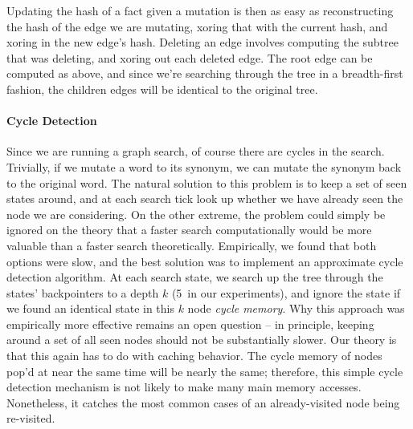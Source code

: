 Updating the hash of a fact given a mutation is then as easy as reconstructing the hash of the edge we are
  mutating, xoring that with the current hash, and xoring in the new edge's hash.
Deleting an edge involves computing the subtree that was deleting, and xoring out each deleted edge.
  The root edge can be computed as above, and since we're searching through the tree in a breadth-first
  fashion, the children edges will be identical to the original tree.



\paragraph{Cycle Detection}
Since we are running a graph search, of course there are cycles in the search.
Trivially, if we mutate a word to its synonym, we can mutate the synonym back to the original word.
The natural solution to this problem is to keep a set of seen states around, and at each search tick look up
  whether we have already seen the node we are considering.
On the other extreme, the problem could simply be ignored on the theory that a faster search computationally
  would be more valuable than a faster search theoretically.
Empirically, we found that both options were slow, and the best solution was to implement an approximate cycle
  detection algorithm.
At each search state, we search up the tree through the states' backpointers to a depth $k$ (5\ in our experiments),
  and ignore the state if we found an identical state in this $k$ node \textit{cycle memory}.
Why this approach was empirically more effective remains an open question -- 
  in principle, keeping around a set of all seen nodes should not be substantially slower.
Our theory is that this again has to do with caching behavior.
The cycle memory of nodes pop'd at near the same time will be nearly the same; therefore, 
  this simple cycle detection mechanism is not likely to make many main memory accesses.
Nonetheless, it catches the most common cases of an already-visited node being re-visited.
